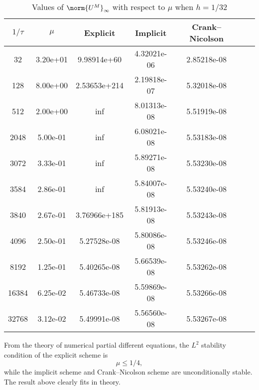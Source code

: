 \documentclass[english, nochinese]{pkupaper}
\begin{document}
\begin{thmquestion}
\begin{thmanswer}
\begin{table}[htbp]
\centering
\caption{Values of $\norm{U^M}_{\infty}$ with respect to $\mu$ when $ h = 1 / 32 $}
\label{Tbl:GridRatio}
\begin{tabular}{|c|c|c|c|c|c|c|}
\hline
$ 1 / \tau $ & $\mu$ & Explicit & Implicit & Crank--Nicolson \\
\hline
32 & 3.20e+01 & 9.98914e+60 & 4.32021e-06 & 2.85218e-08 \\
\hline
128 & 8.00e+00 & 2.53653e+214 & 2.19818e-07 & 5.32018e-08 \\
\hline
512 & 2.00e+00 & inf & 8.01313e-08 & 5.51919e-08 \\
\hline
2048 & 5.00e-01 & inf & 6.08021e-08 & 5.53183e-08 \\
\hline
3072 & 3.33e-01 & inf & 5.89271e-08 & 5.53230e-08 \\
\hline
3584 & 2.86e-01 & inf & 5.84007e-08 & 5.53240e-08 \\
\hline
3840 & 2.67e-01 & 3.76966e+185 & 5.81913e-08 & 5.53243e-08 \\
\hline
4096 & 2.50e-01 & 5.27528e-08 & 5.80086e-08 & 5.53246e-08 \\
\hline
8192 & 1.25e-01 & 5.40265e-08 & 5.66539e-08 & 5.53262e-08 \\
\hline
16384 & 6.25e-02 & 5.46733e-08 & 5.59869e-08 & 5.53266e-08 \\
\hline
32768 & 3.12e-02 & 5.49991e-08 & 5.56560e-08 & 5.53267e-08 \\
\hline
\end{tabular}
\end{table}

From the theory of numerical partial different equations, the $L^2$ stability condition of the explicit scheme is
\begin{equation}
\mu \le 1 / 4,
\end{equation}
while the implicit scheme and Crank--Nicolson scheme are unconditionally stable. The result above clearly fits in theory.
\end{thmanswer}
\end{thmquestion}
\end{document}

